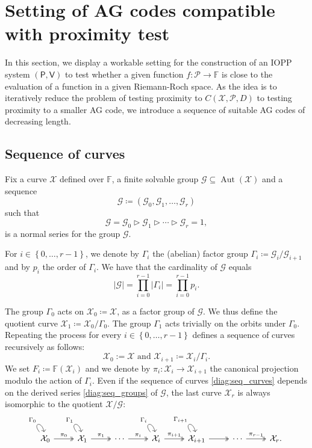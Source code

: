 \documentclass[a4paper,USenglish,autoref]{lipics-v2021}
\newcommand\F{\mathbb{F}}
\DeclareMathOperator{\Aut}{Aut}
\newcommand\prover{\mathsf{P}}
\newcommand\verifier{\mathsf{V}}
\renewcommand{\vec}[1]{\boldsymbol{#1}}
\newcommand{\set}[1]{\left\{#1\right\}}
\newcommand{\size}[1]{\left|#1\right|}
\newcommand{\range}[1]{\set{0,\dots,#1-1}}
\newcommand\calX{\mathcal{X}}
\newcommand\calP{\mathcal{P}}
\newcommand\calG{\mathcal{G}}
\newcommand\seqG{\vec{\calG}}
\newcommand\mydef{\coloneqq}
\begin{document}
\section{Setting of AG codes compatible with proximity test}\label{sec:foldable}

In this section, we display a workable setting for the construction of an IOPP system $(\prover, \verifier)$ to test whether a given function $f : \calP \rightarrow \F$ is close to the evaluation of a function in a given Riemann-Roch space. As the idea is to iteratively reduce the problem of testing proximity to $C(\calX, \calP, D)$ to testing proximity to a smaller AG code, we introduce a sequence of suitable AG codes of decreasing length.

\subsection{Sequence of curves}\label{subsec:seq-curves}
Fix a curve $\calX$ defined over $\F$, a finite solvable group $\calG \subseteq \Aut(\calX)$ and a sequence \[\seqG \mydef (\calG_0, \calG_1, \dots, \calG_r)\] such that 
\begin{equation}\label{diag:seq_groups}
	\calG=\calG_0 \vartriangleright \calG_1 \vartriangleright \cdots \vartriangleright \calG_r = 1,
\end{equation}
is a normal series for the group $\calG$.

For $i \in \range{r}$, we denote by $\Gamma_i$ the (abelian) factor group $\Gamma_i \mydef \calG_i /\calG_{i+1}$ and by $p_i$ the order of $\Gamma_i$. We have that the cardinality of $\calG$ equals \[\size{\calG}=\prod_{i=0}^{r-1} \size {\Gamma_i} =\prod_{i=0}^{r-1} p_i.\]

The group $\Gamma_0$ acts on $\calX_0\mydef \calX$, as a factor group of $\calG$. We thus define the quotient curve $\calX_1 \mydef \calX_0 / \Gamma_0$. The group $\Gamma_1$ acts trivially on the orbits under $\Gamma_0$. Repeating the process for every ${i \in \range{r}}$ defines a sequence of curves recursively  as follows:
\[\calX_0:=\calX \text{ and } \calX_{i+1} \mydef\calX_i/\Gamma_i.\]
We set $F_i \mydef \F(\calX_i)$ and we denote by $\pi_i: \calX_i \rightarrow \calX_{i+1}$ the canonical projection modulo the action of $\Gamma_i$.
Even if the sequence of curves \eqref{diag:seq_curves} depends on the derived series \eqref{diag:seq_groups} of $\calG$, the last curve $\calX_r$ is always isomorphic to the quotient $\calX / \calG$: \begin{equation}\label{diag:seq_curves}
	\begin{tikzcd}
		\calX_0\arrow[loop, distance=14, out=130, in=100,"\Gamma_0"] \arrow[r, two heads, "\pi_0"] & \calX_1\arrow[loop, distance=14, out=130, in=100,"\Gamma_1"] \arrow[r, two heads, "\pi_1"] & \cdots  \arrow[r, two heads, "\pi_i"] & \calX_i\arrow[loop, distance=14, out=130, in=100,"\Gamma_i"] \arrow[r, two heads, "\pi_{i+1}"]& \calX_{i+1}\arrow[loop, distance=14, out=130, in=100,"\Gamma_{i+1}"] \arrow[r, two heads] & \cdots \arrow[r, two heads,"\pi_{r-1}"] & \calX_{r}.
	\end{tikzcd}
\end{equation}
\end{document}
